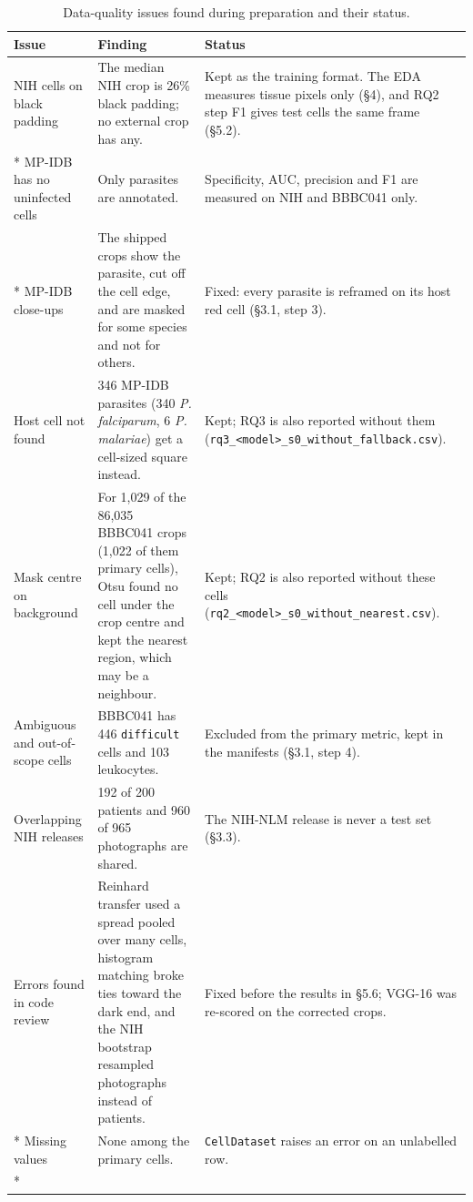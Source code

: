 \documentclass[11pt,a4paper]{article}
\begin{document}
{\small
\begin{longtable}{@{}>{\raggedright\arraybackslash\hspace{0pt}}p{69.8pt}>{\raggedright\arraybackslash\hspace{0pt}}p{135.5pt}>{\raggedright\arraybackslash\hspace{0pt}}p{118.7pt}@{}}
\toprule
Issue & Finding & Status \\
\midrule
\endhead
\bottomrule
\endfoot
\bottomrule
\caption{Data-quality issues found during preparation and their status.}
\endlastfoot
NIH cells on black padding & The median NIH crop is 26\% black padding; no external crop has any. & Kept as the training format. The EDA measures tissue pixels only (\S{}4), and RQ2 step F1 gives test cells the same frame (\S{}5.2). \\*
MP-IDB has no uninfected cells & Only parasites are annotated. & Specificity, AUC, precision and F1 are measured on NIH and BBBC041 only. \\*
MP-IDB close-ups & The shipped crops show the parasite, cut off the cell edge, and are masked for some species and not for others. & Fixed: every parasite is reframed on its host red cell (\S{}3.1, step 3). \\
Host cell not found & 346 MP-IDB parasites (340 \emph{P. falciparum}, 6 \emph{P. malariae}) get a cell-sized square instead. & Kept; RQ3 is also reported without them (\texttt{rq3\_\allowbreak{}<model>\_\allowbreak{}s0\_\allowbreak{}without\_\allowbreak{}fallback.\allowbreak{}csv}). \\
Mask centre on background & For 1,029 of the 86,035 BBBC041 crops (1,022 of them primary cells), Otsu found no cell under the crop centre and kept the nearest region, which may be a neighbour. & Kept; RQ2 is also reported without these cells (\texttt{rq2\_\allowbreak{}<model>\_\allowbreak{}s0\_\allowbreak{}without\_\allowbreak{}nearest.\allowbreak{}csv}). \\
Ambiguous and out-of-scope cells & BBBC041 has 446 \texttt{difficult} cells and 103 leukocytes. & Excluded from the primary metric, kept in the manifests (\S{}3.1, step 4). \\
Overlapping NIH releases & 192 of 200 patients and 960 of 965 photographs are shared. & The NIH-NLM release is never a test set (\S{}3.3). \\
Errors found in code review & Reinhard transfer used a spread pooled over many cells, histogram matching broke ties toward the dark end, and the NIH bootstrap resampled photographs instead of patients. & Fixed before the results in \S{}5.6; VGG-16 was re-scored on the corrected crops. \\*
Missing values & None among the primary cells. & \texttt{CellDataset} raises an error on an unlabelled row. \\*
\end{longtable}}
\end{document}
